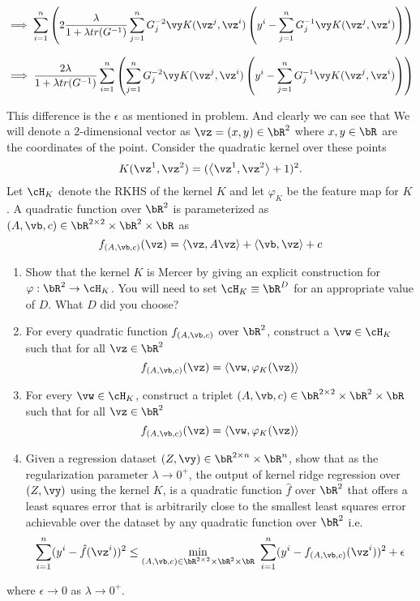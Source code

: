 \documentclass[a4paper,11pt]{article}
\begin{document}
\begin{mlsolution}
$$ \implies \sum_{i=1}^n \left(  2\frac{\lambda}{1+\lambda tr(G^{-1})} \sum_{j=1}^n  G^{-2}_j \vy K(\vz^j, \vz^i)\left(y^i - \sum_{j=1}^n G^{-1}_j \vy K(\vz^j, \vz^i) \right) \right)$$

$$ \implies \frac{2\lambda}{1+\lambda tr(G^{-1})}\sum_{i=1}^n \left(   \sum_{j=1}^n  G^{-2}_j \vy K(\vz^j, \vz^i)\left(y^i - \sum_{j=1}^n G^{-1}_j \vy K(\vz^j, \vz^i) \right) \right) $$

This difference is the $\epsilon$ as mentioned in problem. And clearly we can see that 
We will denote a $2$-dimensional vector as $\vz = (x,y) \in \bR^2$ where $x,y\in\bR$ are the coordinates of the point. Consider the quadratic kernel over these points
\[
K(\vz^1,\vz^2) = (\ip{\vz^1}{\vz^2} + 1)^2.
\]
Let $\cH_K$ denote the RKHS of the kernel $K$ and let $\varphi_K$ be the feature map for $K$. A quadratic function over $\bR^2$ is parameterized as $(A,\vb,c) \in \bR^{2\times 2}\times\bR^2\times \bR$ as 
\[
f_{(A,\vb,c)}(\vz) = \ip{\vz}{A\vz} + \ip{\vb}{\vz} + c
\]
\begin{enumerate}
	\item Show that the kernel $K$ is Mercer by giving an explicit construction for $\varphi: \bR^2 \rightarrow \cH_K$. You will need to set $\cH_K \equiv \bR^D$ for an appropriate value of $D$. What $D$ did you choose?
	\item For every quadratic function $f_{(A,\vb,c)}$ over $\bR^2$, construct a $\vw \in \cH_K$ such that for all $\vz \in \bR^2$
	\[
	f_{(A,\vb,c)}(\vz) = \ip{\vw}{\varphi_K(\vz)}
	\]
	\item For every $\vw \in \cH_K$, construct a triplet $(A,\vb,c) \in \bR^{2\times 2}\times\bR^2\times \bR$ such that for all $\vz \in \bR^2$
	\[
		f_{(A,\vb,c)}(\vz) = \ip{\vw}{\varphi_K(\vz)}
	\]
	\item Given a regression dataset $(Z,\vy) \in \bR^{2 \times n} \times \bR^n$, show that as the regularization parameter $\lambda \rightarrow 0^+$, the output of kernel ridge regression over $(Z,\vy)$ using the kernel $K$, is a quadratic function $\hat f$ over $\bR^2$ that offers a least squares error that is arbitrarily close to the smallest least squares error achievable over the dataset by any quadratic function over $\bR^2$ i.e.
	\[
	\sum_{i=1}^n(y^i - \hat f(\vz^i))^2 \leq \min_{(A,\vb,c) \in \bR^{2\times 2}\times\bR^2\times \bR}\ \sum_{i=1}^n(y^i - f_{(A,\vb,c)}(\vz^i))^2 + \epsilon
	\]
\end{enumerate}
where $\epsilon \rightarrow 0$ as $\lambda \rightarrow 0^+$.

\end{mlsolution}
\end{document}
